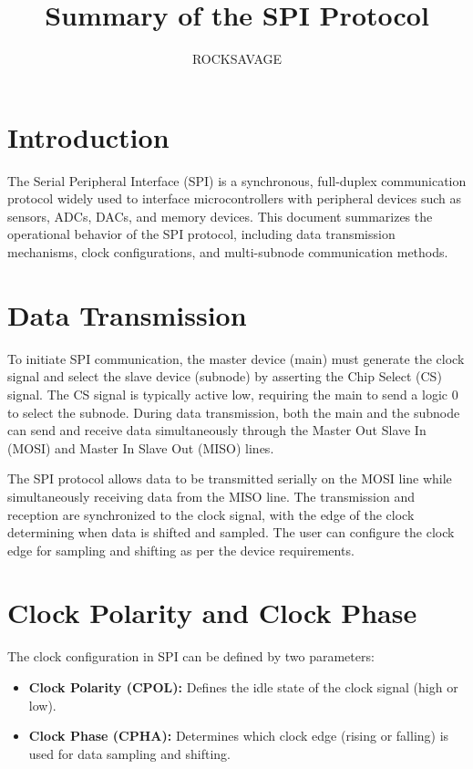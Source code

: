 \documentclass{article}
\title{Summary of the SPI Protocol}
\author{ROCKSAVAGE}
\date{}
\begin{document}
\maketitle

\section{Introduction}
The Serial Peripheral Interface (SPI) is a synchronous, full-duplex communication protocol widely used to interface microcontrollers with peripheral devices such as sensors, ADCs, DACs, and memory devices. This document summarizes the operational behavior of the SPI protocol, including data transmission mechanisms, clock configurations, and multi-subnode communication methods.

\section{Data Transmission}
To initiate SPI communication, the master device (main) must generate the clock signal and select the slave device (subnode) by asserting the Chip Select (CS) signal. The CS signal is typically active low, requiring the main to send a logic 0 to select the subnode. During data transmission, both the main and the subnode can send and receive data simultaneously through the Master Out Slave In (MOSI) and Master In Slave Out (MISO) lines.

The SPI protocol allows data to be transmitted serially on the MOSI line while simultaneously receiving data from the MISO line. The transmission and reception are synchronized to the clock signal, with the edge of the clock determining when data is shifted and sampled. The user can configure the clock edge for sampling and shifting as per the device requirements.

\section{Clock Polarity and Clock Phase}
The clock configuration in SPI can be defined by two parameters:
\begin{itemize}
    \item \textbf{Clock Polarity (CPOL):} Defines the idle state of the clock signal (high or low).
    \item \textbf{Clock Phase (CPHA):} Determines which clock edge (rising or falling) is used for data sampling and shifting.
\end{itemize}
\end{document}
